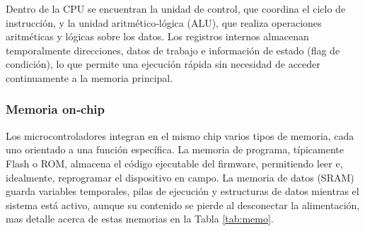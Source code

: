Dentro de la CPU se encuentran la unidad de control, que coordina el ciclo de instrucción, y la unidad aritmético‑lógica (ALU), que realiza operaciones aritméticas y lógicas sobre los datos. Los registros internos almacenan temporalmente direcciones, datos de trabajo e información de estado (flag de condición), lo que permite una ejecución rápida sin necesidad de acceder continuamente a la memoria principal.

\subsubsection{Memoria on‑chip}
Los microcontroladores integran en el mismo chip varios tipos de memoria, cada uno orientado a una función específica. La memoria de programa, típicamente Flash o ROM, almacena el código ejecutable del firmware, permitiendo leer e, idealmente, reprogramar el dispositivo en campo. La memoria de datos (SRAM) guarda variables temporales, pilas de ejecución y estructuras de datos mientras el sistema está activo, aunque su contenido se pierde al desconectar la alimentación, mas detalle acerca de estas memorias en la Tabla \ref{tab:memo}.

